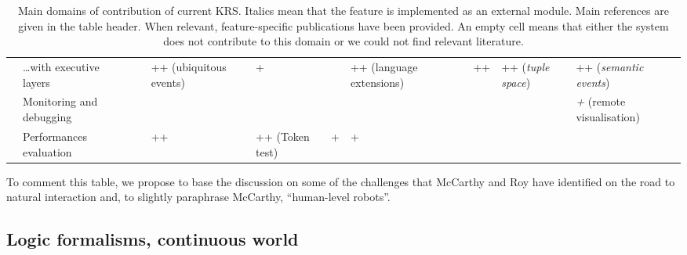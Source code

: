 \begin{landscape}
\begin{table}
\begin{center}
\begin{tabular}{p{0.2cm}p{3.4cm}p{1.6cm}p{1.3cm}p{1.7cm}p{1.5cm}p{2cm}p{2cm}p{1.4cm}p{1.4cm}|p{2cm}}
                                                      & \ldots with executive layers &                           & ++ (ubiquitous events)      & +                           &                             & ++ (language extensions) \cite{Beetz2010} &                                          & ++                            & ++ (\emph{tuple space})       & ++ (\emph{semantic events})                   \\
                                                          & Monitoring and debugging &                           &                             &                             &                             &                                    &                                                 &                               &                               & {\it+} (remote visualisation)                 \\
                                                           & Performances evaluation &                           & ++ \cite{Hawes2008}         & ++ (Token test)             & +                           & + \cite{Tenorth2011}               &                                                 &                               &                               &                                               \\

\bottomrule

\end{tabular}
\end{center}

\caption{Main domains of contribution of current KRS. Italics mean that the
feature is implemented as an external module. Main references are given in the
table header. When relevant, feature-specific publications have been provided.
An empty cell means that either the system does not contribute to this domain
or we could not find relevant literature.}

\label{table|contribution-by-systems}
\end{table}
\end{landscape}

To comment this table, we propose to base the discussion on some of the
challenges that McCarthy and Roy have identified on the road to natural
interaction and, to slightly paraphrase McCarthy, ``human-level robots''.


\subsection{Logic formalisms, continuous world}

